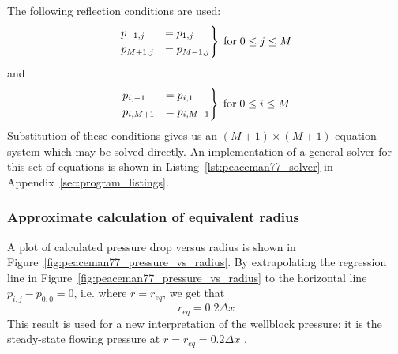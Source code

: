The following reflection conditions are used:
\begin{equation}
    \begin{rcases}
        p_{-1,j} &= p_{1,j} \\
        p_{M+1,j} &= p_{M-1,j}
    \end{rcases} \; \mathrm{for} \; 0\leq j \leq M
\end{equation}
and
\begin{equation}
    \begin{rcases}
        p_{i,-1} &= p_{i,1} \\
        p_{i,M+1} &= p_{i,M-1}
    \end{rcases} \; \mathrm{for} \; 0\leq i \leq M
\end{equation}
Substitution of these conditions gives us an $(M+1)\times (M+1)$ equation system which may be solved directly. An implementation of a general solver for this set of equations is shown in Listing~\ref{lst:peaceman77_solver} in Appendix~\ref{sec:program_listings}.


\subsubsection{Approximate calculation of equivalent radius} %
\label{ssub:approximate_calculation_of_equivalent_radius}
A plot of calculated pressure drop versus radius is shown in Figure~\ref{fig:peaceman77_pressure_vs_radius}. By extrapolating  the regression line in Figure~\ref{fig:peaceman77_pressure_vs_radius} to the horizontal line $p_{i,j}-p_{0,0}=0$, i.e. where $r=r_{eq}$, we get that
\begin{equation}
    r_{eq} = 0.2 \Delta x
\end{equation}
This result is used for a new interpretation of the wellblock pressure: it is the steady-state flowing pressure at $r=r_{eq}=0.2 \Delta x$ \citet{Peaceman1978Interpretation}.

